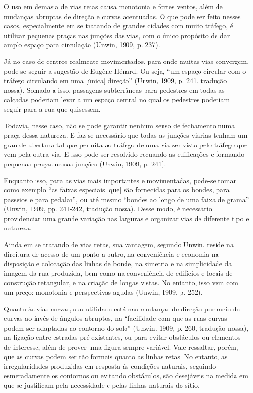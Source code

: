 \documentclass[12pt, a4paper]{book} %
\begin{document}
        O uso em demasia de vias retas causa monotonia e fortes ventos, além de mudanças abruptas de direção e curvas acentuadas. O que pode ser feito nesses casos, especialmente em se tratando de grandes cidades com muito tráfego, é utilizar pequenas praças nas junções das vias, com o único propósito de dar amplo espaço para circulação (Unwin, 1909, p. 237).

        Já no caso de centros realmente movimentados, para onde muitas vias convergem, pode-se seguir a sugestão de Eugène Hénard. Ou seja, ``um espaço circular com o tráfego circulando em uma [única] direção'' (Unwin, 1909, p. 241, tradução nossa). Somado a isso, passagens subterrâneas para pedestres em todas as calçadas poderiam levar a um espaço central no qual os pedestres poderiam seguir para a rua que quisessem.

        Todavia, nesse caso, não se pode garantir nenhum senso de fechamento numa praça dessa natureza. E faz-se necessário que todas as junções viárias tenham um grau de abertura tal que permita ao tráfego de uma via ser visto pelo tráfego que vem pela outra via. E isso pode ser resolvido recuando as edificações e formando pequenas praças nessas junções (Unwin, 1909, p. 241).

        Enquanto isso, para as vias mais importantes e movimentadas, pode-se tomar como exemplo ``as faixas especiais [que] são fornecidas para os bondes, para passeios e para pedalar'', ou até mesmo ``bondes ao longo de uma faixa de grama'' (Unwin, 1909, pp. 241-242, tradução nossa). Desse modo, é necessário providenciar uma grande variação nas larguras e organizar vias de diferente tipo e natureza.

        Ainda em se tratando de vias retas, sua vantagem, segundo Unwin, reside na direitura de acesso de um ponto a outro, na conveniência e economia na disposição e colocação das linhas de bonde, na simetria e na simplicidade da imagem da rua produzida, bem como na conveniência de edifícios e locais de construção retangular, e na criação de longas vistas. No entanto, isso vem com um preço: monotonia e perspectivas agudas (Unwin, 1909, p. 252).
        
        Quanto às vias curvas, sua utilidade está nas mudanças de direção por meio de curvas ao invés de ângulos abruptos, na ``facilidade com que as ruas curvas podem ser adaptadas ao contorno do solo'' (Unwin, 1909, p. 260, tradução nossa), na ligação entre estradas pré-existentes, ou para evitar obstáculos ou elementos de interesse, além de prover uma figura sempre variável. Vale ressaltar, porém, que as curvas podem ser tão formais quanto as linhas retas. No entanto, as irregularidades produzidas em resposta às condições naturais, seguindo esmeradamente os contornos ou evitando obstáculos, são desejáveis na medida em que se justificam pela necessidade e pelas linhas naturais do sítio.
\end{document}
